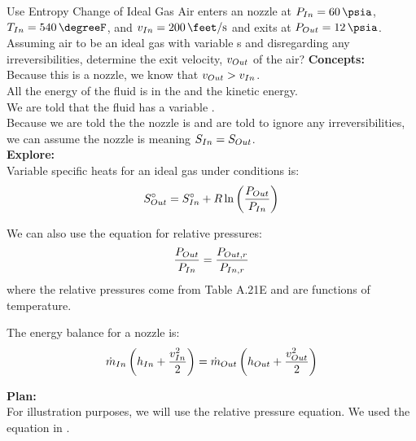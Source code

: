 \begin{example}{Use Entropy Change of Ideal Gas}
  Air enters an  nozzle at $\Pressure_{In} = \SI{60}{\psia}$, $\Temp_{In} = \SI{540}{\degreeF}$, and $\Velocity_{In} = \SI{200}{\feet\per\second}$ and exits at $\Pressure_{Out} = \SI{12}{\psia}$.
  Assuming air to be an ideal gas with variable s and disregarding any irreversibilities, determine the exit velocity, $v_{Out}$ of the air?
  \tcblower{}
  \textbf{Concepts:} \\
  Because this is a nozzle, we know that $v_{Out} > v_{In}$. \\
  All the energy of the fluid is in the  and the kinetic energy. \\
  We are told that the fluid has a variable . \\
  Because we are told the the nozzle is  and are told to ignore any irreversibilities, we can assume the nozzle is  meaning $S_{In} = S_{Out}$. \\

  \textbf{Explore:} \\
  Variable specific heats for an ideal gas under  conditions is:
  \begin{equation*}
    S_{Out}^{\circ} = S_{In}^{\circ} + R \ln \left( \frac{P_{Out}}{P_{In}} \right)
  \end{equation*}

  We can also use the equation for relative pressures:
  \begin{equation*}
    \frac{P_{Out}}{P_{In}} = \frac{P_{Out, r}}{P_{In, r}}
  \end{equation*}
  where the relative pressures come from Table A.21E and are functions of temperature.

  The energy balance for a nozzle is:
  \begin{equation*}
    \dot{m}_{In} \left( h_{In} + \frac{v_{In}^{2}}{2} \right) = \dot{m}_{Out} \left( h_{Out} + \frac{v_{Out}^{2}}{2} \right)
  \end{equation*}

  \textbf{Plan:} \\
  For illustration purposes, we will use the relative pressure equation.
  We used the  equation in .


\end{example}
